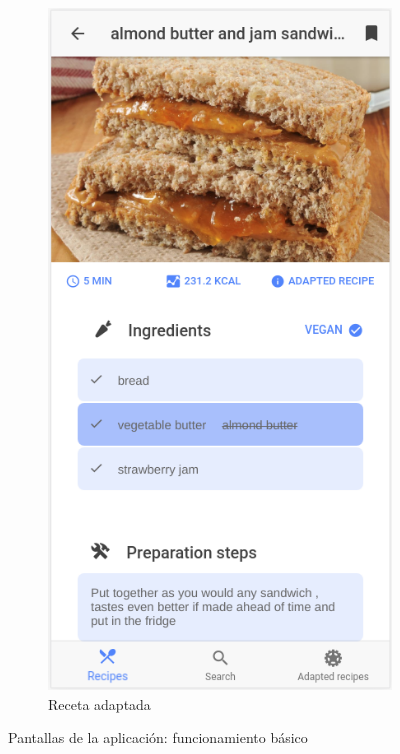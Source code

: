 \begin{figure}[H]
\begin{subfigure}[b]{0.32\linewidth}
        \label{fig:pantallas_basicas_2}
    \end{subfigure}
    \begin{subfigure}[b]{0.32\linewidth}
        \includegraphics[width=\linewidth]{imagenes/app/pantallas/app_3.png}
        \caption{Receta adaptada}
        \label{fig:pantallas_basicas_3}
    \end{subfigure}
    \caption{Pantallas de la aplicación: funcionamiento básico}
    \label{fig:ejemplo_uso}
\end{figure} 

